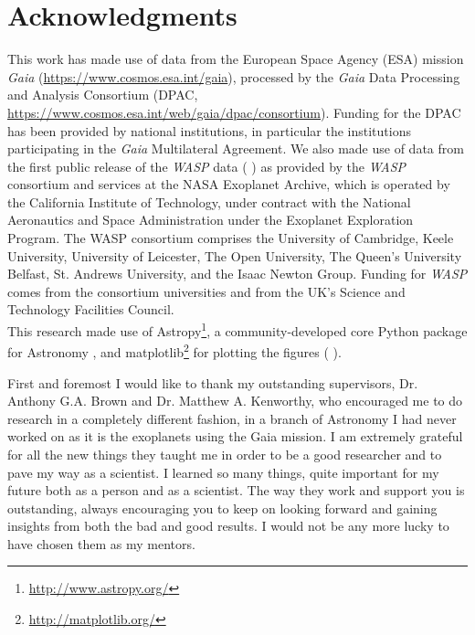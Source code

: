 \newpage

\begingroup
\let\clearpage\relax
\let\cleardoublepage\relax
\let\cleardoublepage\relax
\chapter*{Acknowledgments}

\bigskip

This work has made use of data from the European Space Agency (ESA) mission \textit{Gaia} (\url{https://www.cosmos.esa.int/gaia}), processed by the \textit{Gaia} Data Processing and Analysis Consortium (DPAC, \url{https://www.cosmos.esa.int/web/gaia/dpac/consortium}). Funding for the DPAC has been provided by national institutions, in particular the institutions participating in the \textit{Gaia} Multilateral Agreement. We also made use of data from the first public release of the \textit{WASP} data ( \citeyear{2010A&A...520L..10B}) as provided by the \textit{WASP} consortium and services at the NASA Exoplanet Archive, which is operated by the California Institute of Technology, under contract with the National Aeronautics and Space Administration under the Exoplanet Exploration Program. The WASP consortium comprises the University of Cambridge, Keele University, University of Leicester, The Open University, The Queen's University Belfast, St. Andrews University, and the Isaac Newton Group. Funding for \textit{WASP} comes from the consortium universities and from the UK’s Science and Technology Facilities Council.\\

This research made use of Astropy\footnote{\url{http://www.astropy.org/}}, a community-developed core Python package for Astronomy  \citeyear{2013A&A...558A..33A}, and matplotlib\footnote{\url{http://matplotlib.org/}} for plotting the figures ( \citeyear{2007CSE.....9...90H}).

\bigskip

\noindent{\color{halfgray}{\rule[0.5ex]{\linewidth}{0.5pt}}}

\bigskip

First and foremost I would like to thank my outstanding supervisors, Dr. Anthony G.A. Brown and Dr. Matthew A. Kenworthy, who encouraged me to do research in a completely different fashion, in a branch of Astronomy I had never worked on as it is the exoplanets using the Gaia mission. I am extremely grateful for all the new things they taught me in order to be a good researcher and to pave my way as a scientist. I learned so many things, quite important for my future both as a person and as a scientist. The way they work and support you is outstanding, always encouraging you to keep on looking forward and gaining insights from both the bad and good results.  I would not be any more lucky to have chosen them as my mentors.\\

